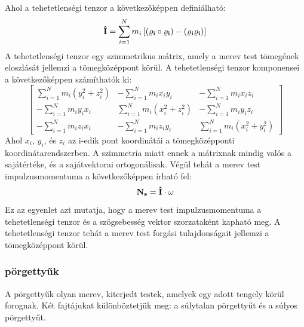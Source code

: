 \documentclass[a4paper,12pt]{article}
\begin{document}
Ahol a tehetetlenségi tenzor a következőképpen definiálható:
\begin{equation}
    \bold{\hat{I}} = \sum_{i=1}^{N} m_i \left[(\bold{\varrho_i} \circ \bold{\varrho_i}) - (\bold{\varrho_i} \bold{\varrho_i})\right]
\end{equation}
A tehetetlenségi tenzor egy szimmetrikus mátrix, amely a merev test tömegének eloszlását jellemzi a tömegközéppont körül. A tehetetlenségi tenzor komponensei a következőképpen számíthatók ki:
\begin{equation}
\begin{bmatrix}
\sum_{i=1}^{N} m_i (y_i^2 + z_i^2) & -\sum_{i=1}^{N} m_i x_i y_i & -\sum_{i=1}^{N} m_i x_i z_i \\
-\sum_{i=1}^{N} m_i y_i x_i & \sum_{i=1}^{N} m_i (x_i^2 + z_i^2) & -\sum_{i=1}^{N} m_i y_i z_i \\
-\sum_{i=1}^{N} m_i z_i x_i & -\sum_{i=1}^{N} m_i z_i y_i & \sum_{i=1}^{N} m_i (x_i^2 + y_i^2)
\end{bmatrix}
\end{equation}
Ahol $x_i$, $y_i$, és $z_i$ az i-edik pont koordinátái a tömegközépponti koordinátarendszerben. A szimmetria miatt ennek a mátrixnak mindig valós a sajátértéke, és a sajátvektorai ortogonálisak.
Végül tehát a merev test impulzusmomentuma a következőképpen írható fel:
\begin{equation}
    \bold{N_s} = \bold{\hat{I}} \cdot \bold{\omega}
\end{equation}
Ez az egyenlet azt mutatja, hogy a merev test impulzusmomentuma a tehetetlenségi tenzor és a szögsebesség vektor szorzataként kapható meg. A tehetetlenségi tenzor tehát a merev test forgási tulajdonságait jellemzi a tömegközéppont körül.

\subsubsection{pörgettyűk}
A pörgettyűk olyan merev, kiterjedt testek, amelyek egy adott tengely körül forognak. Két fajtájukat különböztetjük meg: a súlytalan pörgettyűt és a súlyos pörgettyűt.
\end{document}
